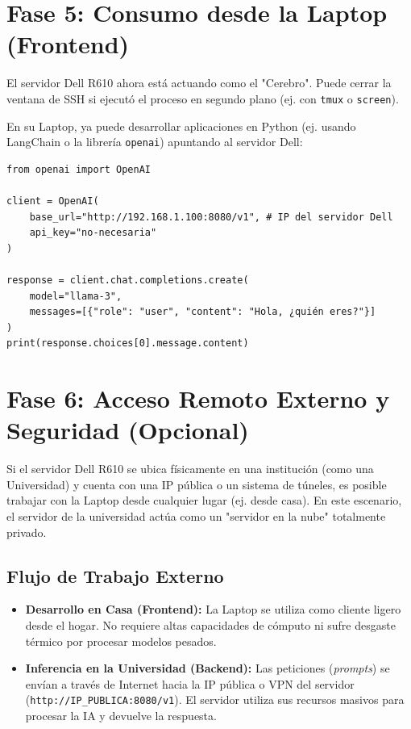\documentclass[12pt,a4paper]{article}
\begin{document}
\section{Fase 5: Consumo desde la Laptop (Frontend)}
El servidor Dell R610 ahora está actuando como el "Cerebro". Puede cerrar la ventana de SSH si ejecutó el proceso en segundo plano (ej. con \texttt{tmux} o \texttt{screen}).

En su Laptop, ya puede desarrollar aplicaciones en Python (ej. usando LangChain o la librería \texttt{openai}) apuntando al servidor Dell:

\begin{verbatim}
from openai import OpenAI

client = OpenAI(
    base_url="http://192.168.1.100:8080/v1", # IP del servidor Dell
    api_key="no-necesaria"
)

response = client.chat.completions.create(
    model="llama-3",
    messages=[{"role": "user", "content": "Hola, ¿quién eres?"}]
)
print(response.choices[0].message.content)
\end{verbatim}

\section{Fase 6: Acceso Remoto Externo y Seguridad (Opcional)}
Si el servidor Dell R610 se ubica físicamente en una institución (como una Universidad) y cuenta con una IP pública o un sistema de túneles, es posible trabajar con la Laptop desde cualquier lugar (ej. desde casa). En este escenario, el servidor de la universidad actúa como un "servidor en la nube" totalmente privado.

\subsection{Flujo de Trabajo Externo}
\begin{itemize}
    \item \textbf{Desarrollo en Casa (Frontend):} La Laptop se utiliza como cliente ligero desde el hogar. No requiere altas capacidades de cómputo ni sufre desgaste térmico por procesar modelos pesados.
    \item \textbf{Inferencia en la Universidad (Backend):} Las peticiones (\textit{prompts}) se envían a través de Internet hacia la IP pública o VPN del servidor (\texttt{http://IP\_PUBLICA:8080/v1}). El servidor utiliza sus recursos masivos para procesar la IA y devuelve la respuesta.
\end{itemize}
\end{document}
